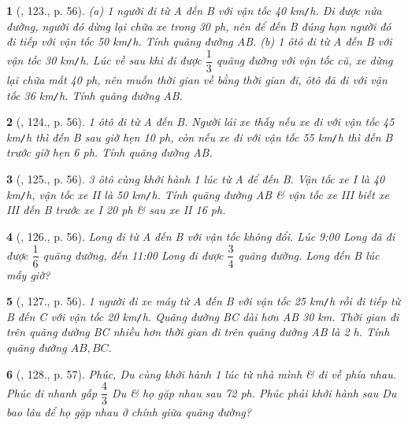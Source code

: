 \documentclass{article}
\newtheorem{baitoan}{}
\begin{document}
\begin{baitoan}[\cite{Binh_Toan_6_tap_2}, 123., p. 56]
	(a) 1 người đi từ A đến B với vận tốc {\rm40 km{\tt/}h}. Đi được nửa đường, người đó dừng lại chữa xe trong {\rm30 ph}, nên để đến B đúng hạn người đó đi tiếp với vận tốc {\rm50 km{\tt/}h}. Tính quãng đường AB. (b) 1 ôtô đi từ A đến B với vận tốc {\rm30 km{\tt/}h}. Lúc về sau khi đi được $\dfrac{1}{3}$ quãng đường với vận tốc cũ, xe dừng lại chữa mất {\rm40 ph}, nên muốn thời gian về bằng thời gian đi, ôtô đã đi với vận tốc {\rm36 km{\tt/}h}. Tính quãng đường AB.
\end{baitoan}

\begin{baitoan}[\cite{Binh_Toan_6_tap_2}, 124., p. 56]
	1 ôtô đi từ A đến B. Người lái xe thấy nếu xe đi với vận tốc {\rm45 km{\tt/}h} thì đến B sau giờ hẹn {\rm10 ph}, còn nếu xe đi với vận tốc {\rm55 km{\tt/}h} thì đến B trước giờ hẹn {\rm6 ph}. Tính quãng đường AB.
\end{baitoan}

\begin{baitoan}[\cite{Binh_Toan_6_tap_2}, 125., p. 56]
	3 ôtô cùng khởi hành 1 lúc từ A để đến B. Vận tốc xe I là {\rm40 km{\tt/}h}, vận tốc xe II là {\rm50 km{\tt/}h}. Tính quãng đường AB \& vận tốc xe III biết xe III đến B trước xe I {\rm20 ph} \& sau xe II {\rm16 ph}.
\end{baitoan}

\begin{baitoan}[\cite{Binh_Toan_6_tap_2}, 126., p. 56]
	Long đi từ A đến B với vận tốc không đổi. Lúc {\rm9:00} Long đã đi được $\dfrac{1}{6}$ quãng đường, đến {\rm11:00} Long đi được $\dfrac{3}{4}$ quãng đường. Long đến B lúc mấy giờ?
\end{baitoan}

\begin{baitoan}[\cite{Binh_Toan_6_tap_2}, 127., p. 56]
	1 người đi xe máy từ A đến B với vận tốc {\rm25 km{\tt/}h} rồi đi tiếp từ B đến C với vận tốc {\rm20 km{\tt/}h}. Quãng đường BC dài hơn AB {\rm30 km}. Thời gian đi trên quãng đường BC nhiều hơn thời gian đi trên quãng đường AB là {\rm2 h}. Tính quãng đường $AB,BC$.
\end{baitoan}

\begin{baitoan}[\cite{Binh_Toan_6_tap_2}, 128., p. 57]
	Phúc, Du cùng khởi hành 1 lúc từ nhà mình \& đi về phía nhau. Phúc đi nhanh gấp $\dfrac{4}{3}$ Du \& họ gặp nhau sau {\rm72 ph}. Phúc phải khởi hành sau Du bao lâu để họ gặp nhau ở chính giữa quãng đường?
\end{baitoan}
\end{document}
